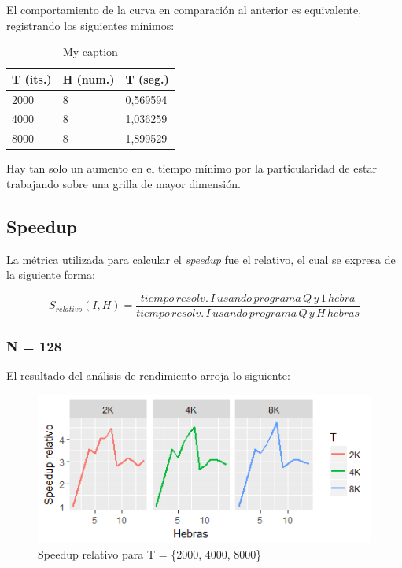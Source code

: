 \documentclass[jou]{apa6}
\begin{document}
El comportamiento de la curva en comparación al anterior es equivalente, registrando los siguientes mínimos:

\begin{table}[]
\centering
\caption{My caption}
\label{my-label}
\begin{tabular}{@{}lll@{}}
\toprule
\multicolumn{1}{c}{T (its.)} & \multicolumn{1}{c}{H (num.)} & \multicolumn{1}{c}{T (seg.)} \\ \midrule
2000                         & 8                            & 0,569594                     \\
4000                         & 8                            & 1,036259                     \\
8000                         & 8                            & 1,899529                     \\ \bottomrule
\end{tabular}
\end{table}

Hay tan solo un aumento en el tiempo mínimo por la particularidad de estar trabajando sobre una grilla de mayor dimensión.

\subsection{Speedup}
La métrica utilizada para calcular el \textit{speedup} fue el relativo, el cual se expresa de la siguiente forma:

\[
	S_{relativo}(I, H) = \frac{tiempo\, resolv.\, I\, usando\, programa\, Q\, y\, 1\, hebra}{tiempo\, resolv.\, I\, usando\, programa\, Q\, y\, H\, hebras}
\]

\subsubsection{N = 128}
El resultado del análisis de rendimiento arroja lo siguiente:

\begin{figure}[h]
	\includegraphics[width=\columnwidth]{srel-128px.png}
	\caption{Speedup relativo para T = \{2000, 4000, 8000\}}
	\label{fig:Figure3}
\end{figure}
\end{document}
